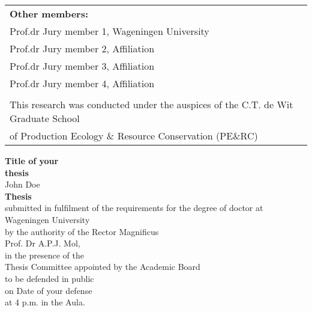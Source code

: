 \begin{tabular}{l}
    \textbf{Other members:}                                                                   \\  
    Prof.dr Jury member 1, Wageningen University                                              \\  
    Prof.dr Jury member 2, Affiliation                                                        \\  
    Prof.dr Jury member 3, Affiliation                                                        \\  
    Prof.dr Jury member 4, Affiliation                                                        \\  
                                                                                              \\  

    \small{This research was conducted under the auspices of the C.T. de Wit Graduate School} \\  
    \small{of Production Ecology \& Resource Conservation (PE$\&$RC)}                         \\  
\end{tabular}

\newpage
\thispagestyle{empty}
\begin{center}
\Huge{\textbf{Title of your}} \\
\Huge{\textbf{thesis}} \\
\vspace*{1cm}
\Large{John Doe}\\
\normalsize
\vspace*{\fill}
\textbf{Thesis} \\
submitted in fulfilment of the requirements for the degree of doctor at \\
Wageningen University\\
by the authority of the Rector Magnificus\\
Prof. Dr A.P.J. Mol,\\
in the presence of the\\
Thesis Committee appointed by the Academic Board\\
to be defended in public\\
on Date of your defense\\
at 4 p.m. in the Aula.\\
\end{center}

